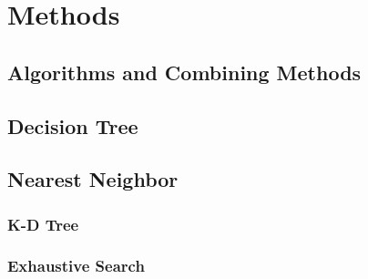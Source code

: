 \section{Methods}
	\subsection{Algorithms and Combining Methods}
	\subsection{Decision Tree}
    
	\subsection{Nearest Neighbor}
		\subsubsection{K-D Tree}
		\subsubsection{Exhaustive Search}

